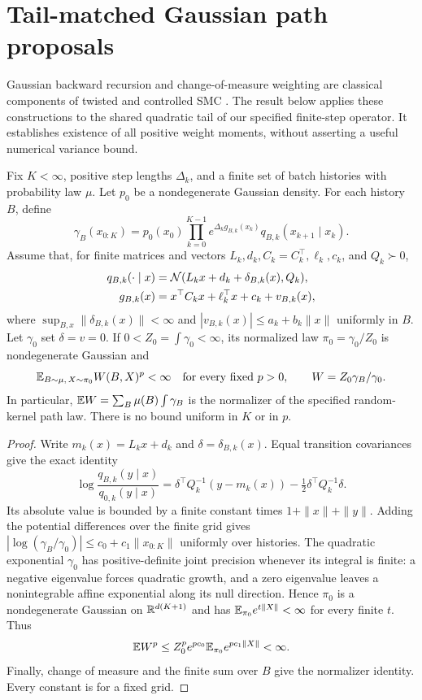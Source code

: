 \section{Tail-matched Gaussian path proposals}
\label{sec:gaussian-twist-theorem}

Gaussian backward recursion and change-of-measure weighting are classical components of twisted and controlled SMC \citep{whiteley2014,heng2020}. The result below applies these constructions to the shared quadratic tail of our specified finite-step operator. It establishes existence of all positive weight moments, without asserting a useful numerical variance bound.

\begin{theorem}
\label{thm:gaussian-twist-moments}
Fix $K<\infty$, positive step lengths $\Delta_k$, and a finite set of batch histories with probability law $\mu$. Let $p_0$ be a nondegenerate Gaussian density. For each history $B$, define
\[
 \gamma_B(x_{0:K})=p_0(x_0)\prod_{k=0}^{K-1}
 e^{\Delta_k g_{B,k}(x_k)}q_{B,k}(x_{k+1}\mid x_k).
\]
Assume that, for finite matrices and vectors $L_k,d_k,C_k=C_k^\top,\ell_k,c_k$, and $Q_k\succ0$,
\begin{align*}
 q_{B,k}(\cdot\mid x)&=\mathcal N(L_kx+d_k+\delta_{B,k}(x),Q_k),\\
 g_{B,k}(x)&=x^\top C_kx+\ell_k^\top x+c_k+v_{B,k}(x),
\end{align*}
where $\sup_{B,x}\|\delta_{B,k}(x)\|<\infty$ and
$|v_{B,k}(x)|\leq a_k+b_k\|x\|$ uniformly in $B$.
Let $\gamma_0$ set $\delta=v=0$. If $0<Z_0=\int\gamma_0<\infty$, its normalized law $\pi_0=\gamma_0/Z_0$ is nondegenerate Gaussian and
\[
 \mathbb E_{B\sim\mu,\,X\sim\pi_0} W(B,X)^p<\infty
 \quad\text{for every fixed }p>0,\qquad
 W=Z_0\gamma_B/\gamma_0.
\]
In particular, $\mathbb E W=\sum_B\mu(B)\int\gamma_B$ is the normalizer of the specified random-kernel path law. There is no bound uniform in $K$ or in $p$.
\end{theorem}

\begin{proof}
Write $m_k(x)=L_kx+d_k$ and $\delta=\delta_{B,k}(x)$. Equal transition covariances give the exact identity
\[
 \log\frac{q_{B,k}(y\mid x)}{q_{0,k}(y\mid x)}
 =\delta^\top Q_k^{-1}(y-m_k(x))
   -\tfrac12\delta^\top Q_k^{-1}\delta.
\]
Its absolute value is bounded by a finite constant times
$1+\|x\|+\|y\|$. Adding the potential differences over the finite grid gives
$|\log(\gamma_B/\gamma_0)|\leq c_0+c_1\|x_{0:K}\|$ uniformly over histories. The quadratic exponential $\gamma_0$ has positive-definite joint precision whenever its integral is finite: a negative eigenvalue forces quadratic growth, and a zero eigenvalue leaves a nonintegrable affine exponential along its null direction. Hence $\pi_0$ is a nondegenerate Gaussian on $\mathbb R^{d(K+1)}$ and has $\mathbb E_{\pi_0}e^{t\|X\|}<\infty$ for every finite $t$. Thus
\[
 \mathbb E W^p\leq Z_0^p e^{pc_0}\mathbb E_{\pi_0}e^{pc_1\|X\|}<\infty.
\]
Finally, change of measure and the finite sum over $B$ give the normalizer identity. Every constant is for a fixed grid.
\end{proof}

